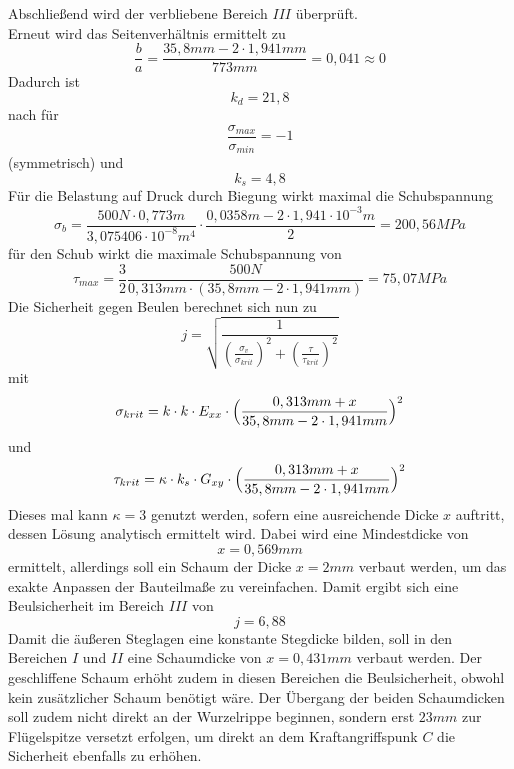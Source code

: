 \noindent Abschließend wird der verbliebene Bereich $III$ überprüft.\\
\noindent Erneut wird das Seitenverhältnis ermittelt zu 
\begin{equation}
	\frac{b}{a}=\frac{35,8mm - 2\cdot 1,941mm}{773mm}=0,041\approx 0
\end{equation}
Dadurch ist
\begin{equation}
	k_{d}=21,8
\end{equation}
nach \cite{item1} für 
\begin{equation}
	\frac{\sigma_{max}}{\sigma_{min}}=-1
\end{equation} 
(symmetrisch) und
\begin{equation}
	k_{s} = 4,8
\end{equation}
Für die Belastung auf Druck durch Biegung wirkt maximal die Schubspannung
\begin{equation}
	\sigma_{b} = \frac{500N\cdot 0,773m}{3,075406\cdot 10^{-8}m^{4}}\cdot\frac{0,0358m - 2\cdot 1,941\cdot 10^{-3}m}{2}=200,56 MPa
\end{equation}
für den Schub wirkt die maximale Schubspannung von
\begin{equation}
	\tau_{max}=\frac{3}{2}\frac{500N}{0,313mm\cdot(35,8mm-2\cdot 1,941mm)}=75,07MPa
\end{equation}
Die Sicherheit gegen Beulen berechnet sich nun zu 
\begin{equation}
	j=\sqrt{\frac{1}{(\frac{\sigma_{v}}{\sigma_{krit}})^{2}+(\frac{\tau}{\tau_{krit}})^{2}}}
\end{equation}
mit 
\begin{equation}
	\sigma_{krit}=k\cdot k\cdot E_{xx}\cdot \Bigl(\frac{0,313mm+x}{35,8mm -2\cdot 1,941mm}\Bigr)^{2}
\end{equation}
und
\begin{equation}
	\tau_{krit} = \kappa\cdot k_{s}\cdot G_{xy}\cdot\Bigl(\frac{0,313mm + x}{35,8mm -2\cdot 1,941mm}\Bigr)^{2}
\end{equation}
Dieses mal kann $\kappa=3$ genutzt werden, sofern eine ausreichende Dicke $x$ auftritt, dessen Lösung analytisch ermittelt wird. Dabei wird eine Mindestdicke von 
\begin{equation}
	x=0,569mm
\end{equation}
ermittelt, allerdings soll ein Schaum der Dicke $x=2mm$ verbaut werden, um das exakte Anpassen der Bauteilmaße zu vereinfachen. Damit ergibt sich eine Beulsicherheit im Bereich $III$ von
\begin{equation}
	j=6,88
\end{equation}
Damit die äußeren Steglagen eine konstante Stegdicke bilden, soll in den Bereichen $I$ und $II$ eine Schaumdicke von $x=0,431mm$ verbaut werden. Der geschliffene Schaum erhöht zudem in diesen Bereichen die Beulsicherheit, obwohl kein zusätzlicher Schaum benötigt wäre. Der Übergang der beiden Schaumdicken soll zudem nicht direkt an der Wurzelrippe beginnen, sondern erst $23mm$ zur Flügelspitze versetzt erfolgen, um direkt an dem Kraftangriffspunk $C$ die Sicherheit ebenfalls zu erhöhen.
